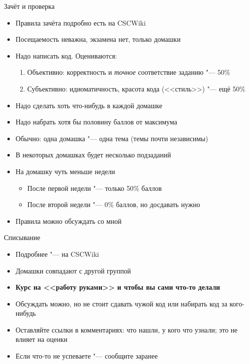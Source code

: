 \begin{frame}[t]{Зачёт и проверка}
	\begin{itemize}
		\item Правила зачёта подробно есть на CSCWiki
		\item Посещаемость неважна, экзамена нет, только домашки
		\item Надо написать код. Оцениваются:
			\begin{enumerate}
			\item Объективно: корректность и \textit{точное} соответствие заданию "--- 50\%
			\item Субъективно: идиоматичность, красота кода (<<стиль>>) "--- ещё 50\%
			\end{enumerate}
		\item Надо сделать хоть что-нибудь в каждой домашке
		\item Надо набрать хотя бы половину баллов от максимума
		\item Обычно: одна домашка "--- одна тема (темы почти независимы)
		\item В некоторых домашках будет несколько подзаданий
		\item На домашку чуть меньше недели
			\begin{itemize}
				\item После первой недели "--- только 50\% баллов
				\item После второй недели "--- 0\% баллов, но досдавать нужно
			\end{itemize}
		\item Правила можно обсуждать со мной
	\end{itemize}
\end{frame}

\begin{frame}[t]{Списывание}
	\begin{itemize}
		\item Подробнее "--- на CSCWiki
		\item Домашки совпадают с другой группой
		\item \textbf{Курс на <<работу руками>> и чтобы вы сами что-то делали}
		\item Обсуждать можно, но не стоит сдавать чужой код или набирать код за кого-нибудь
		\item Оставляйте ссылки в комментариях: что нашли, у кого что узнали; это не влияет на оценки
		\item Если что-то не успеваете "--- сообщите заранее
	\end{itemize}
\end{frame}

